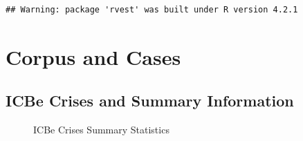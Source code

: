 \documentclass{article}
\begin{document}
\begin{verbatim}
## Warning: package 'rvest' was built under R version 4.2.1
\end{verbatim}

\clearpage

\hypertarget{corpus-and-cases}{%
\section{Corpus and Cases}\label{corpus-and-cases}}

\hypertarget{app:crises}{%
\subsection{ICBe Crises and Summary Information}\label{app:crises}}

\begin{figure}[H]
\caption{ICBe Crises Summary Statistics}
\end{figure}
\clearpage
\end{document}

